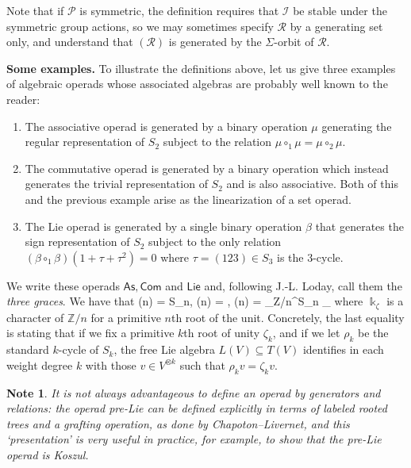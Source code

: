 \documentclass[fleqn, a4paper, twoside]{article}
\makeatletter
\newcommand{\0}{\langle 0\rangle}
\newcommand{\RR}{\mathcal{R}}
\newenvironment{tenumerate}{
 \begin{enumerate}
  \setlength{\itemsep}{0pt}
  \setlength{\parskip}{0pt}
}{\end{enumerate}}
\let\[\@undefined
\DeclareRobustCommand{\[}{\begin{equation}}%
\let\]\@undefined
\DeclareRobustCommand{\]}{\end{equation}}%
\theoremstyle{mytheorem}
\theoremstyle{introthm}
\theoremstyle{mydefinition}
\newtheorem{note}[theorem]{Note}
\theoremstyle{mydefinition2}
\theoremstyle{plain} %
\newcommand{\As}{\mathsf{As}}
\newcommand{\Com}{\mathsf{Com}}
\newcommand{\Lie}{\mathsf{Lie}}
\newcommand{\?}{\,?\,}
\newcommand{\kk}{\Bbbk}
\newcommand{\PP}{{\mathcal{P}}}
\theoremstyle{mytheorem}
\theoremstyle{plain} %
\makeatother
\begin{document}
Note that if $\PP$ is symmetric, the definition
requires that $\mathcal{I}$ be stable under
the symmetric group actions, so we may 
sometimes specify $\RR$ by a generating set 
only, and understand
that $(\RR)$ is generated by the $\Sigma$-orbit
of $\RR$.

\bigskip

\textbf{Some examples.}
To illustrate the definitions above, let us
give three examples of algebraic operads whose
associated algebras are probably well known
to the reader: 
\begin{tenumerate}
\item The associative operad is generated by a 
binary operation $\mu$ generating the regular
representation of $S_2$ subject to the relation
$\mu\circ_1 \mu = \mu \circ_2 \mu$. 
\item The commutative operad is generated by a 
binary operation which instead generates the
trivial representation of $S_2$ and is
also associative. Both of this 
and the previous
example arise as the linearization of a set operad.
\item 
The Lie operad is generated by a single binary 
operation $\beta$ that generates the sign 
representation of $S_2$ subject to the only
relation
$(\beta \circ_1 \beta)(1+\tau+\tau^2) = 0$
where $\tau = (123)\in S_3$ is the $3$-cycle. 
\end{tenumerate}
We write these operads $\mathsf{As},\mathsf{Com}$
and $\mathsf{Lie}$ and, following J.-L. Loday,
call them the \emph{three graces}. We have that
\[ \As(n) = \kk S_n,\quad
 	\Com(n) = \kk, \quad
 	 \Lie(n) = _{\mathbb Z/n}^{S_n} \kk_\zeta \] 
 where $\kk_\zeta$ is a character of $\mathbb Z/n$
 for a primitive $n$th root of the unit. Concretely,
 the last equality is stating that if we fix a primitive
 $k$th root of unity $\zeta_k$, and if we let $\rho_k$ be
 the standard $k$-cycle of $S_k$, the free Lie
 algebra $L(V)\subseteq T(V)$ identifies  
 in each weight degree $k$ with those $v
 \in V^{\otimes k}$ such that $\rho_k v = \zeta_k v$. 
 
\begin{note} It is not always advantageous
to define an operad by generators and relations:
the operad pre-Lie can be defined explicitly
in terms of labeled rooted trees and a grafting
operation, as done by Chapoton--Livernet, and
this `presentation' is very useful in practice,
for example, to show that the pre-Lie operad
is Koszul.
\end{note}
\end{document}
